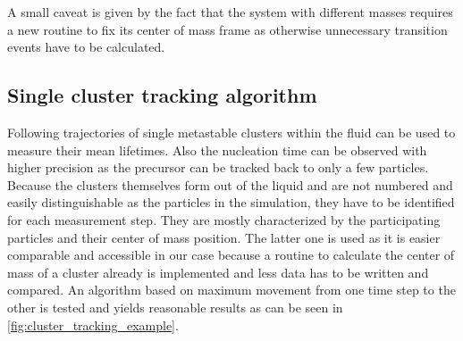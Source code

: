 A small caveat is given by the fact that the system with different masses requires a new routine to fix its center of mass frame as otherwise unnecessary transition events have to be calculated.

\subsection{Single cluster tracking algorithm}
\label{sec:tracking}
Following trajectories of single metastable clusters within the fluid can be used to measure their mean lifetimes. Also the nucleation time can be observed with higher precision as the precursor can be tracked back to only a few particles.\\ 
Because the clusters themselves form out of the liquid and are not numbered and easily distinguishable as the particles in the simulation, they have to be identified for each measurement step. They are mostly characterized by the participating particles and their center of mass position. The latter one is used as it is easier comparable and accessible in our case because a routine to calculate the center of mass of a cluster already is implemented and less data has to be written and compared. An algorithm based on maximum movement from one time step to the other is tested and yields reasonable results as can be seen in \autoref{fig:cluster_tracking_example}.\\

